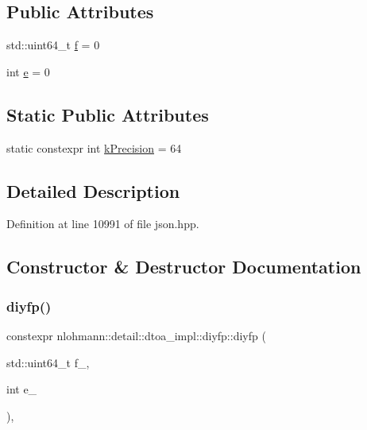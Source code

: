 \subsection*{Public Attributes}
\begin{DoxyCompactItemize}
\item 
std\+::uint64\+\_\+t \mbox{\hyperlink{structnlohmann_1_1detail_1_1dtoa__impl_1_1diyfp_aea90459e340a231ca31d46946803ef51}{f}} = 0
\item 
int \mbox{\hyperlink{structnlohmann_1_1detail_1_1dtoa__impl_1_1diyfp_ae22e170815983961447c429f324c944d}{e}} = 0
\end{DoxyCompactItemize}
\subsection*{Static Public Attributes}
\begin{DoxyCompactItemize}
\item 
static constexpr int \mbox{\hyperlink{structnlohmann_1_1detail_1_1dtoa__impl_1_1diyfp_a03682754b06ed4f30b263119eecc2d52}{k\+Precision}} = 64
\end{DoxyCompactItemize}


\subsection{Detailed Description}


Definition at line 10991 of file json.\+hpp.



\subsection{Constructor \& Destructor Documentation}
\mbox{\label{structnlohmann_1_1detail_1_1dtoa__impl_1_1diyfp_ad8798a8823a49c8412f0fada9892c918}} 
\subsubsection{\texorpdfstring{diyfp()}{diyfp()}}
{\footnotesize\ttfamily constexpr nlohmann\+::detail\+::dtoa\+\_\+impl\+::diyfp\+::diyfp (\begin{DoxyParamCaption}\item[{std\+::uint64\+\_\+t}]{f\+\_\+,  }\item[{int}]{e\+\_\+ }\end{DoxyParamCaption})\hspace{0.3cm}{\ttfamily [inline]}, {\ttfamily [noexcept]}}



